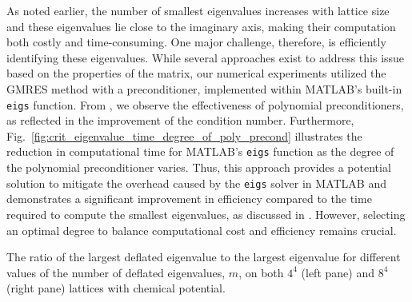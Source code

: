 As noted earlier, the number of smallest eigenvalues increases with lattice size and these eigenvalues lie close to the imaginary axis, making their computation both costly and time-consuming. One major challenge, therefore, is efficiently identifying these eigenvalues. While several approaches exist to address this issue based on the properties of the matrix, our numerical experiments utilized the GMRES method with a preconditioner, implemented within MATLAB's built-in \texttt{eigs} function. From \cite{52}, we observe the effectiveness of polynomial preconditioners, as reflected in the improvement of the condition number. Furthermore, Fig.~\ref{fig:crit_eigenvalue_time_degree_of_poly_precond} illustrates the reduction in computational time for MATLAB’s \texttt{eigs} function as the degree of the polynomial preconditioner varies. Thus, this approach provides a potential solution to mitigate the overhead caused by the \texttt{eigs} solver in MATLAB and demonstrates a significant improvement in efficiency compared to the time required to compute the smallest eigenvalues, as discussed in \cite{52}. However, selecting an optimal degree to balance computational cost and efficiency remains crucial.

\begin{table}[H]
    \centering
    \begin{minipage}{0.45\textwidth}
        \centering
    \end{minipage}
    \hspace{0.02\textwidth} %
    \begin{minipage}{0.45\textwidth}
        \centering
        
    \end{minipage}
    \caption{\small The ratio of the largest deflated eigenvalue to the largest eigenvalue for different values of the number of deflated eigenvalues, $m$, on both $4^4$ (left pane) and $8^4$ (right pane) lattices with chemical potential.}
    \label{tab:crit_eigenvalue_time_degree_of_poly_precond} %
\end{table}


